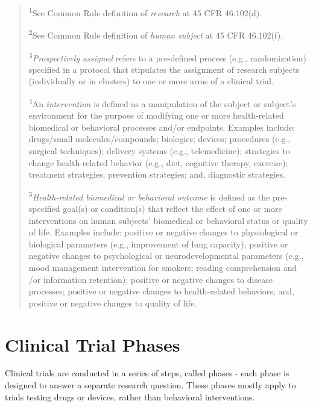 \documentclass[]{book}
\theoremstyle{definition}
\theoremstyle{definition}
\theoremstyle{definition}
\theoremstyle{remark}
\begin{document}
\begin{quote}
\textsuperscript{1}See Common Rule definition of \emph{research} at 45
CFR 46.102(d).

\textsuperscript{2}See Common Rule definition of \emph{human subject} at
45 CFR 46.102(f).

\textsuperscript{3}\emph{Prospectively assigned} refers to a pre-defined
process (e.g., randomization) specified in a protocol that stipulates
the assignment of research subjects (individually or in clusters) to one
or more arms of a clinical trial.

\textsuperscript{4}An \emph{intervention} is defined as a manipulation
of the subject or subject's environment for the purpose of modifying one
or more health-related biomedical or behavioral processes and/or
endpoints. Examples include: drugs/small molecules/compounds; biologics;
devices; procedures (e.g., surgical techniques); delivery systems (e.g.,
telemedicine); strategies to change health-related behavior (e.g., diet,
cognitive therapy, exercise); treatment strategies; prevention
strategies; and, diagnostic strategies.

\textsuperscript{5}\emph{Health-related biomedical or behavioral
outcome} is defined as the pre-specified goal(s) or condition(s) that
reflect the effect of one or more interventions on human subjects'
biomedical or behavioral status or quality of life. Examples include:
positive or negative changes to physiological or biological parameters
(e.g., improvement of lung capacity); positive or negative changes to
psychological or neurodevelopmental parameters (e.g., mood management
intervention for smokers; reading comprehension and /or information
retention); positive or negative changes to disease processes; positive
or negative changes to health-related behaviors; and, positive or
negative changes to quality of life.
\end{quote}

\section{Clinical Trial Phases}\label{clinical-trial-phases}

Clinical trials are conducted in a series of steps, called phases - each
phase is designed to answer a separate research question. These phases
mostly apply to trials testing drugs or devices, rather than behavioral
interventions.
\end{document}
